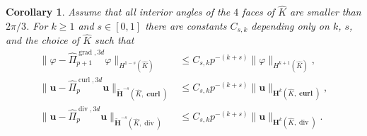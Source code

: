 \documentclass{article}
\newtheorem{corollary}[theorem]{Corollary}
\newcommand{\hatPicurlcom}{\widehat \Pi^{\operatorname*{curl},3d}_p}
\newcommand{\hatPigradcom}{\widehat\Pi^{\operatorname*{grad},3d}_{p+1}}
\newcommand{\hatPidivcom}{\widehat\Pi^{\operatorname*{div},3d}_{p}}
\begin{document}
\begin{corollary}
\label{cor:thm:projection-based-interpolation}
Assume that all interior angles of the $4$ faces of $\widehat  K$ are smaller than $2\pi/3$.
For $k \ge 1$ and $s\in [0,1]$ there are constants $C_{s,k}$ depending only on $k$, $s$, and the 
choice of $\widehat K$ such that 
\begin{align}
\label{eq:cor:thm:projection-based-interpolation-1}
\|\varphi - \hatPigradcom \varphi\|_{H^{1-s}(\widehat K)} &\leq C_{s,k} p^{-(k+s)}\|\varphi\|_{H^{k+1}(\widehat K)}, \\
\label{eq:cor:thm:projection-based-interpolation-2}
\|{\mathbf u} - \hatPicurlcom {\mathbf u}\|_{\widetilde{\mathbf H}^{-s}(\widehat K,\operatorname{\mathbf{curl}})} 
&\leq C_{s,k} p^{-(k+s)}\|{\mathbf u}\|_{{\mathbf H}^{k}(\widehat K,\operatorname{\mathbf{curl}})}, \\
\label{eq:cor:thm:projection-based-interpolation-3}
\|{\mathbf u} - \hatPidivcom {\mathbf u}\|_{\widetilde{\mathbf H}^{-s}(\widehat K,\operatorname{div})} 
&\leq C_{s,k} p^{-(k+s)}\|{\mathbf u}\|_{{\mathbf H}^{k}(\widehat K,\operatorname{div})}.  
\end{align}
\end{corollary}
\end{document}
